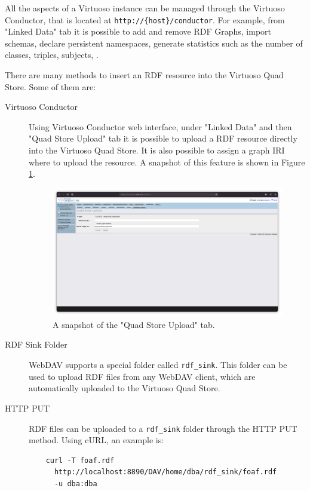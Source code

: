 All the aspects of a Virtuoso instance can be managed through the Virtuoso Conductor, that is located at \verb#http://{host}/conductor#. For example, from "Linked Data" tab it is possible to add and remove \ac{RDF} Graphs, import schemas, declare persistent namespaces, generate statistics such as the number of classes, triples, subjects, \etc.

There are many methods to insert an \ac{RDF} resource into the Virtuoso Quad Store. Some of them are:

\begin{description}
  \item[Virtuoso Conductor] Using Virtuoso Conductor web interface, under "Linked Data" and then "Quad Store Upload" tab it is possible to upload a \ac{RDF} resource directly into the Virtuoso Quad Store. It is also possible to assign a graph \ac{IRI} where to upload the resource. A snapshot of this feature is shown in Figure \ref{fig:virtuoso-upload}.
  \begin{figure}[!ht]
    \centering
    \includegraphics[width=\columnwidth]{images/virtuoso/virtuoso-upload}
    \caption{A snapshot of the "Quad Store Upload" tab.}
    \label{fig:virtuoso-upload}
  \end{figure}

  \item[RDF Sink Folder] WebDAV supports a special folder called \verb#rdf_sink#. This folder can be used to upload \ac{RDF} files from any WebDAV client, which are automatically uploaded to the Virtuoso Quad Store.

  \item[\ac{HTTP} PUT] \ac{RDF} files can be uploaded to a \verb#rdf_sink# folder through the \ac{HTTP} PUT method. Using cURL, an example is:
  \begin{verbatim}
    curl -T foaf.rdf
      http://localhost:8890/DAV/home/dba/rdf_sink/foaf.rdf
      -u dba:dba
  \end{verbatim}


\end{description}
